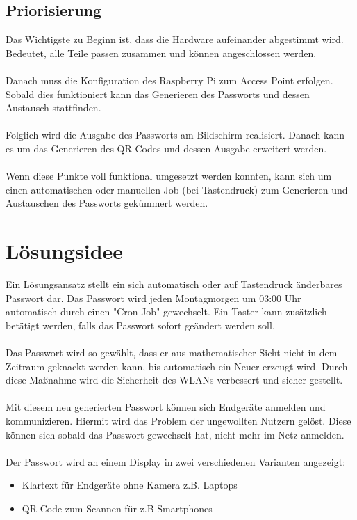 \documentclass[a4paper,11pt,singlespacing]{article}
\begin{document}
    		\subsection{Priorisierung}
            	Das Wichtigste zu Beginn ist, dass die Hardware aufeinander abgestimmt wird. Bedeutet, alle Teile passen zusammen und können angeschlossen werden. \\ \\ 
            	Danach muss die Konfiguration des Raspberry Pi zum Access Point erfolgen. Sobald dies funktioniert kann das Generieren des Passworts und dessen Austausch stattfinden. \\ \\ 
            	Folglich wird die Ausgabe des Passworts am Bildschirm realisiert. Danach kann es um das Generieren des QR-Codes und dessen Ausgabe erweitert werden.\\ \\ 	
            	Wenn diese Punkte voll funktional umgesetzt werden konnten, kann sich um einen automatischen oder manuellen Job (bei Tastendruck) zum Generieren und Austauschen des Passworts gekümmert werden. 
    	
	\section{Lösungsidee}
    	Ein Lösungsansatz stellt ein sich automatisch oder auf Tastendruck änderbares Passwort dar. Das Passwort wird jeden Montagmorgen um 03:00 Uhr automatisch durch einen "Cron-Job" gewechselt. Ein Taster kann zusätzlich betätigt werden, falls das Passwort sofort geändert werden soll. \\ \\
		Das Passwort wird so gewählt, dass er aus mathematischer Sicht nicht in dem Zeitraum geknackt werden kann, bis automatisch ein Neuer erzeugt wird. Durch diese Maßnahme wird die Sicherheit des WLANs verbessert und sicher gestellt.\\ \\
		Mit diesem neu generierten Passwort können sich Endgeräte anmelden und kommunizieren. Hiermit wird das Problem der ungewollten Nutzern gelöst. Diese können sich sobald das Passwort gewechselt hat, nicht mehr im Netz anmelden. \\ \\
		Der Passwort wird an einem Display in zwei verschiedenen Varianten angezeigt:
		\begin{itemize}
			\item Klartext für Endgeräte ohne Kamera z.B. Laptops
			\item QR-Code zum Scannen für z.B Smartphones
		\end{itemize}
		
\end{document}
